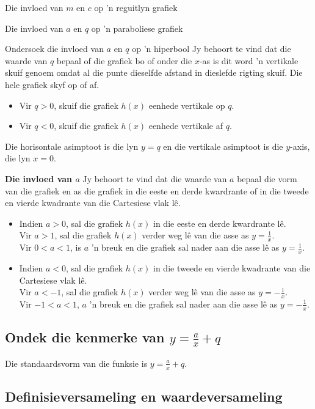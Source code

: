 \begin{Ondersoek}{Die invloed van $m$ en $c$ op 'n reguitlyn grafiek}
\begin{Ondersoek}{Die invloed van $a$ en $q$ op 'n paraboliese grafiek}
\begin{Ondersoek}{Ondersoek die invloed van $a$ en $q$ op 'n hiperbool}
Jy behoort te vind dat die waarde van $q$ bepaal of die grafiek bo of onder die $x$-as is dit word 'n vertikale skuif genoem omdat al die punte dieselfde afstand in dieslefde rigting skuif. Die hele grafiek skyf op of af.  
\begin{itemize}
\item Vir $q>0$, skuif die grafiek $h(x)$ eenhede vertikale op $q$. 
\item Vir $q<0$, skuif die grafiek $h(x)$ eenhede vertikale af $q$.
\end{itemize}
Die horisontale asimptoot is die lyn $y=q$ en die vertikale asimptoot is die $y$-axis, die lyn $x=0$.\par
\vspace{8pt}
\textbf{Die invloed van $a$}\newline
Jy behoort te vind dat die waarde van $a$ bepaal die vorm van die grafiek  en as die grafiek in die eeste en derde kwardrante of in die tweede
en vierde kwadrante van die Cartesiese vlak lê. 
\begin{itemize}
 \item Indien $a>0$, sal die grafiek $h(x)$ in die eeste en derde kwardrante lê. \\
Vir $a>1$, sal die grafiek $h(x)$ verder weg l\^e van die asse as $y=\frac{1}{x}$.
\\Vir $0<a<1$, is $a$ 'n breuk en die grafiek sal nader aan die asse l\^e as $y=\frac{1}{x}$. 
\item Indien $a<0$, sal die grafiek $h(x)$ in die tweede
en vierde kwadrante van die Cartesiese vlak lê.\\
Vir $a<-1$, sal die grafiek $h(x)$ verder weg l\^e van die asse as $y=-\frac{1}{x}$.
\\Vir $-1<a<1$, $a$ 'n breuk en die grafiek sal nader aan die asse l\^e as $y=-\frac{1}{x}$. 
\end{itemize}



\subsection*{Ondek die kenmerke van $y=\frac{a}{x}+q$}  
Die standaardsvorm van die funksie is $y=\frac{a}{x}+q$.

\subsection*{Definisieversameling en waardeversameling}


\end{Ondersoek}
\end{Ondersoek}
\end{Ondersoek}

